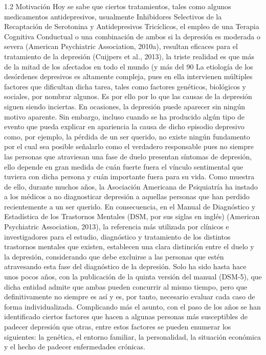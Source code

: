 1.2 Motivación 
Hoy se sabe que ciertos tratamientos, tales como algunos medicamentos antidepresivos, usualmente Inhibidores Selectivos de la Recaptación de Serotonina y Antidepresivos Tricíclicos, el empleo de una Terapia Cognitiva Conductual o una combinación de ambos si la depresión es moderada o severa (American Psychiatric Association, 2010a), resultan eficaces para el tratamiento de la depresión (Cuijpers et al., 2013), la triste realidad es que más de la mitad de los afectados en todo el mundo (y más del 90%
La etiología de los desórdenes depresivos es altamente compleja, pues en ella intervienen múltiples factores que dificultan dicha tarea, tales como factores genéticos, biológicos y sociales, por nombrar algunos. Es por ello por lo que las causas de la depresión siguen siendo inciertas. 
En ocasiones, la depresión puede aparecer sin ningún motivo aparente. Sin embargo, incluso cuando se ha producido algún tipo de evento que pueda explicar en apariencia la causa de dicho episodio depresivo como, por ejemplo, la pérdida de un ser querido, no existe ningún fundamento por el cual sea posible señalarlo como el verdadero responsable pues no siempre las personas que atraviesan una fase de duelo presentan síntomas de depresión, ello depende en gran medida de cuán fuerte fuera el vínculo sentimental que tuviera con dicha persona y cuán importante fuera para su vida.
Como muestra de ello, durante muchos años, la Asociación Americana de Psiquiatría ha instado a los médicos a no diagnosticar depresión a aquellas personas que han perdido recientemente a un ser querido. En consecuencia, en el Manual de Diagnóstico y Estadística de los Trastornos Mentales (DSM, por sus siglas en inglés) (American Psychiatric Association, 2013), la referencia más utilizada por clínicos e investigadores para el estudio, diagnóstico y tratamiento de los distintos trastornos mentales que existen, establecen una clara distinción entre el duelo y la depresión, considerando que debe excluirse a las personas que estén atravesando esta fase del diagnóstico de la depresión. Solo ha sido hasta hace unos pocos años, con la publicación de la quinta versión del manual (DSM-5), que dicha entidad admite que ambas pueden concurrir al mismo tiempo, pero que definitivamente no siempre es así y es, por tanto, necesario evaluar cada caso de forma individualizada.
Complicando más el asunto, con el paso de los años se han identificado ciertos factores que hacen a algunas personas más susceptibles de padecer depresión que otras, entre estos factores se pueden enumerar los siguientes: la genética, el entorno familiar, la personalidad, la situación económica y el hecho de padecer enfermedades crónicas.
